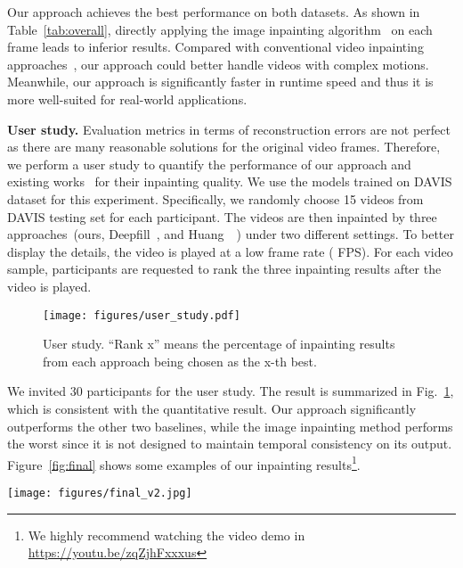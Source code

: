 \documentclass[10pt,twocolumn,letterpaper]{article}
\begin{document}
Our approach achieves the best performance on both datasets.
As shown in Table~\ref{tab:overall}, directly applying the image inpainting algorithm~\cite{yu2018generative} on each frame leads to inferior results.
Compared with conventional video inpainting approaches~\cite{Huang-SigAsia-2016, newson2014video}, our approach could better handle videos with complex motions.
Meanwhile, our approach is significantly faster in runtime speed and thus it is more well-suited for real-world applications.

\noindent
\textbf{User study.}
Evaluation metrics in terms of reconstruction errors are not perfect as there are many reasonable solutions for the original video frames. 
Therefore, we perform a user study to quantify the performance of our approach and existing works~\cite{Huang-SigAsia-2016, yu2018generative} for their inpainting quality. 
We use the models trained on DAVIS dataset for this experiment. 
Specifically, we randomly choose 15 videos from DAVIS testing set for each participant. The videos are then inpainted by three approaches~(ours, Deepfill~\cite{yu2018generative}, and Huang~\etal~\cite{Huang-SigAsia-2016}) under two different settings.
To better display the details, the video is played at a low frame rate ( FPS).
For each video sample, participants are requested to rank the three inpainting results after the video is played.


\begin{figure}[t]
	\centering
	\texttt{[image: figures/user\_study.pdf]}
	\vspace{-16pt}
	\caption{\small{User study. ``Rank x'' means the percentage of inpainting results from each approach being chosen as the x-th best.}}
	\label{fig:user_study}
	\vspace{-8pt}
\end{figure}

We invited 30 participants for the user study. The result is summarized in Fig.~\ref{fig:user_study}, which is consistent with the quantitative result. Our approach significantly outperforms the other two baselines, while the image inpainting method performs the worst since it is not designed to maintain temporal consistency on its output. Figure~\ref{fig:final} shows some examples of our inpainting results\footnote{We highly recommend watching the video demo in \url{https://youtu.be/zqZjhFxxxus}}.


\begin{figure*}[t]
	\centering
	\texttt{[image: figures/final\_v2.jpg]}
	\vspace{-5pt}
	\caption{\small{Results of our flow-guided video inpainting approach. For each input sequence (odd row), we show representative frames with mask of missing region overlay. We show the inpainting results in even rows. \textbf{Best viewed with zoom-in.}}
	}
	\label{fig:final}
	\vspace{-5pt}
\end{figure*}
\end{document}
